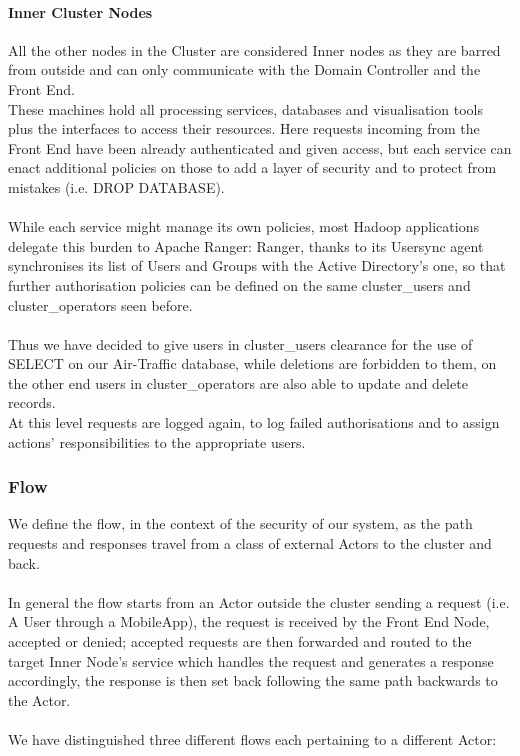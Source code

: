 \paragraph{Inner Cluster Nodes}

All the other nodes in the Cluster are considered Inner nodes as they are barred from outside and can only communicate with the Domain Controller and the Front End. \\
These machines hold all processing services, databases and visualisation tools plus the interfaces to access their resources. Here requests incoming from the Front End have been already authenticated and given access, but each service can enact additional policies on those to add a layer of security and to protect from mistakes (i.e. DROP DATABASE). \\ \\
While each service might manage its own policies, most Hadoop applications delegate this burden to Apache Ranger: Ranger, thanks to its Usersync agent synchronises its list of Users and Groups with the Active Directory's one, so that further authorisation policies can be defined on the same cluster\_users and cluster\_operators seen before. \\ \\
 Thus we have decided to give users in cluster\_users clearance for the use of SELECT on our Air-Traffic database, while deletions are forbidden to them, on the other end users in cluster\_operators are also able to update and delete records.
\\ At this level requests are logged again, to log failed authorisations and to assign actions' responsibilities to the appropriate users.

\subsubsection{Flow}
We define the flow, in the context of the security of our system, as the path requests and responses travel from a class of external Actors to the cluster and back.
\\ \\
In general the flow starts from an Actor outside the cluster sending a request (i.e. A User through a MobileApp), the request is received by the Front End Node, accepted or denied; accepted requests are then forwarded and routed to the target Inner Node's service which handles the request and generates a response accordingly, the response is then set back following the same path backwards to the Actor.
\\ \\
We have distinguished three different flows each pertaining to a different Actor:
